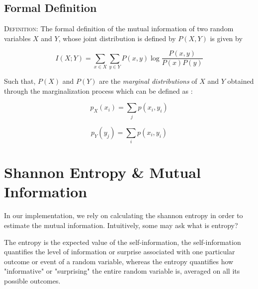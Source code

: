 \documentclass{article}
\begin{document}
\subsection{Formal Definition}
\begin{flushleft}
\vspace{2mm }
\begin{tcolorbox}
\textsc{Definition:}\cite{wiki}\cite{quantiki}\newline\newline
The formal definition of the mutual information of two random variables $X$ and $Y$, whose joint distribution is defined by $P(X, Y)$ is given by
\vspace{4mm}
\begin{center}
\[
I(X;Y) = \sum_{x \in X}^{}\sum_{y \in Y}^{} P(x, y)\log \frac{P(x, y)}{P(x)P(y)}
\]
\end{center}
Such that, $P(X)$ and $P(Y)$ are the \textit{marginal distributions} of $X$ and $Y$ obtained through the marginalization process which can be defined as : 
\begin{center}
\[
p_X(x_i) = \sum_{j}p(x_i, y_i)
\]

\[
p_Y(y_j) = \sum_{i}p(x_i, y_i) 
\]
\end{center}
\end{tcolorbox}
\end{flushleft}

\section{Shannon Entropy \& Mutual Information}
\vspace{2mm}
\begin{flushleft}
In our implementation, we rely on calculating the shannon entropy in order to estimate the mutual information. Intuitively, some may ask what is entropy? 
\end{flushleft}
The entropy is the expected value of the self-information, the self-information quantifies the level of information or surprise associated with one particular outcome or event of a random variable, whereas the entropy quantifies how "informative" or "surprising" the entire random variable is, averaged on all its possible outcomes.
\end{document}
